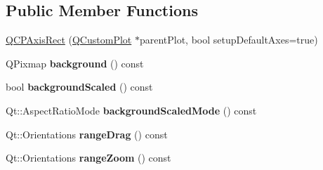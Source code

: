 \subsection*{Public Member Functions}
\begin{DoxyCompactItemize}
\item 
\hyperlink{class_q_c_p_axis_rect_a60b31dece805462c1b82eea2e69ba042}{Q\+C\+P\+Axis\+Rect} (\hyperlink{class_q_custom_plot}{Q\+Custom\+Plot} $\ast$parent\+Plot, bool setup\+Default\+Axes=true)
\item 
Q\+Pixmap {\bfseries background} () const \hypertarget{class_q_c_p_axis_rect_a0daa1dadd2a62dbfa37b7f742edd0059}{}\label{class_q_c_p_axis_rect_a0daa1dadd2a62dbfa37b7f742edd0059}

\item 
bool {\bfseries background\+Scaled} () const \hypertarget{class_q_c_p_axis_rect_a67c18777b88fe9c81dee3dd2b5f50e5c}{}\label{class_q_c_p_axis_rect_a67c18777b88fe9c81dee3dd2b5f50e5c}

\item 
Qt\+::\+Aspect\+Ratio\+Mode {\bfseries background\+Scaled\+Mode} () const \hypertarget{class_q_c_p_axis_rect_a3d0f42d6be11a0b3d4576402a2b0032d}{}\label{class_q_c_p_axis_rect_a3d0f42d6be11a0b3d4576402a2b0032d}

\item 
Qt\+::\+Orientations {\bfseries range\+Drag} () const \hypertarget{class_q_c_p_axis_rect_af24b46954ce27a26b23770cdb8319080}{}\label{class_q_c_p_axis_rect_af24b46954ce27a26b23770cdb8319080}

\item 
Qt\+::\+Orientations {\bfseries range\+Zoom} () const \hypertarget{class_q_c_p_axis_rect_a3397fc60e5df29089090bc236e9f05f6}{}\label{class_q_c_p_axis_rect_a3397fc60e5df29089090bc236e9f05f6}


\end{DoxyCompactItemize}
